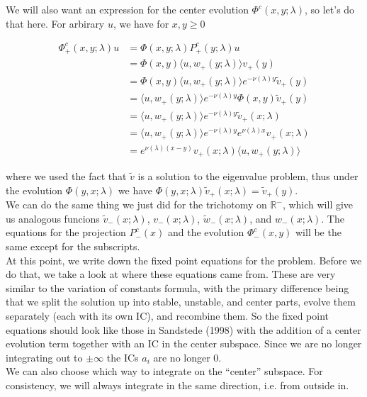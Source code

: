 \documentclass[12pt]{article}
\def\R{{\mathbb R}}
\begin{document}
We will also want an expression for the center evolution $\Phi^c(x,y; \lambda)$, so let's do that here. For arbirary $u$, we have for $x, y \geq 0$

\begin{align*}
\Phi^c_+(x,y; \lambda)u &= \Phi(x,y; \lambda) P^c_+(y; \lambda) u \\
&= \Phi(x,y) \langle u, w_+(y; \lambda) \rangle v_+(y) \\
&= \Phi(x,y) \langle u, w_+(y; \lambda) \rangle e^{-\nu(\lambda)y} \tilde{v}_+(y) \\
&= \langle u, w_+(y; \lambda) \rangle e^{-\nu(\lambda)y} \Phi(x,y) \tilde{v}_+(y) \\
&= \langle u, w_+(y; \lambda) \rangle e^{-\nu(\lambda)y} \tilde{v}_+(x; \lambda) \\
&= \langle u, w_+(y; \lambda) \rangle e^{-\nu(\lambda)y} e^{\nu(\lambda)x} v_+(x; \lambda) \\
&= e^{\nu(\lambda)(x-y)} v_+(x; \lambda) \langle u, w_+(y; \lambda) \rangle 
\end{align*}

where we used the fact that $\tilde{v}$ is a solution to the eigenvalue problem, thus under the evolution $\Phi(y, x; \lambda)$ we have $\Phi(y, x; \lambda)\tilde{v}_+(x; \lambda) = \tilde{v}_+(y)$.\\

We can do the same thing we just did for the trichotomy on $\R^-$, which will give us analogous funcions $\tilde{v}_-(x; \lambda)$, $v_-(x; \lambda)$, $\tilde{w}_-(x; \lambda)$, and $w_-(x; \lambda)$. The equations for the projection $P^c_-(x)$ and the evolution $\Phi^c_-(x,y)$ will be the same except for the subscripts.\\

At this point, we write down the fixed point equations for the problem. Before we do that, we take a look at where these equations came from. These are very similar to the variation of constants formula, with the primary difference being that we split the solution up into stable, unstable, and center parts, evolve them separately (each with its own IC), and recombine them. So the fixed point equations should look like those in Sandstede (1998) with the addition of a center evolution term together with an IC in the center subspace. Since we are no longer integrating out to $\pm \infty$ the ICs $a_i$ are no longer 0.\\

We can also choose which way to integrate on the ``center'' subspace. For consistency, we will always integrate in the same direction, i.e. from outside in.\\
\end{document}
